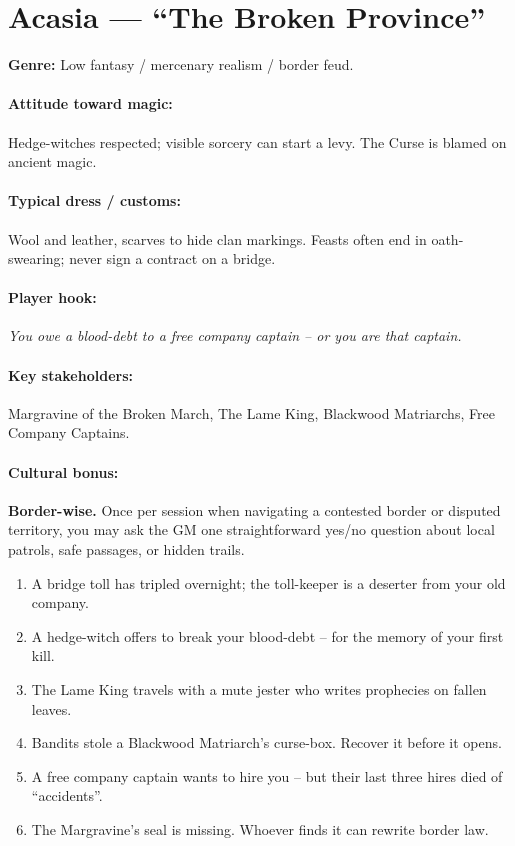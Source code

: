 \section{Acasia --- ``The Broken Province''}
\textbf{Genre:} Low fantasy / mercenary realism / border feud.

\paragraph{Attitude toward magic:} Hedge-witches respected; visible sorcery can start a levy. The Curse is blamed on ancient magic.

\paragraph{Typical dress / customs:} Wool and leather, scarves to hide clan markings. Feasts often end in oath-swearing; never sign a contract on a bridge.

\paragraph{Player hook:} \emph{You owe a blood-debt to a free company captain -- or you are that captain.}

\paragraph{Key stakeholders:} Margravine of the Broken March, The Lame King, Blackwood Matriarchs, Free Company Captains.

\paragraph{Cultural bonus:} \textbf{Border-wise.} Once per session when navigating a contested border or disputed territory, you may ask the GM one straightforward yes/no question about local patrols, safe passages, or hidden trails.

\begin{tcolorbox}[colback=gray!5!white, colframe=gray!70!black, title=Acasia Mini-Generator (d6),breakable]
\begin{enumerate}
\item A bridge toll has tripled overnight; the toll-keeper is a deserter from your old company.
\item A hedge-witch offers to break your blood-debt -- for the memory of your first kill.
\item The Lame King travels with a mute jester who writes prophecies on fallen leaves.
\item Bandits stole a Blackwood Matriarch's curse-box. Recover it before it opens.
\item A free company captain wants to hire you -- but their last three hires died of ``accidents''.
\item The Margravine's seal is missing. Whoever finds it can rewrite border law.
\end{enumerate}
\end{tcolorbox}

